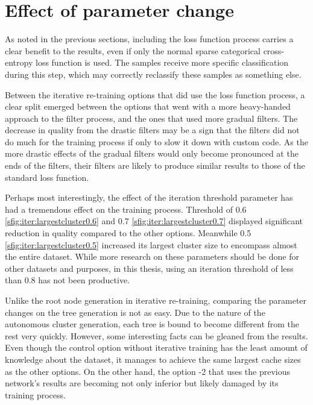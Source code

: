 
\section{Effect of parameter change}

As noted in the previous sections, including the loss function process carries a clear benefit to the results, even if only the normal sparse categorical cross-entropy loss function is used.
The samples receive more specific classification during this step, which may correctly reclassify these samples as something else.

Between the iterative re-training options that did use the loss function process, a clear split emerged between the options that went with a more heavy-handed approach to the filter process, and the ones that used more gradual filters.
The decrease in quality from the drastic filters may be a sign that the filters did not do much for the training process if only to slow it down with custom code.
As the more drastic effects of the gradual filters would only become pronounced at the ends of the filters, their filters are likely to produce similar results to those of the standard loss function.

Perhaps most interestingly, the effect of the iteration threshold parameter has had a tremendous effect on the training process.
Threshold of 0.6 \cref{sfig:iter:largestcluster0.6} and 0.7 \cref{sfig:iter:largestcluster0.7} displayed significant reduction in quality compared to the other options.
Meanwhile 0.5 \cref{sfig:iter:largestcluster0.5} increased its largest cluster size to encompass almost the entire dataset.
While more research on these parameters should be done for other datasets and purposes, in this thesis, using an iteration threshold of less than 0.8 has not been productive.


Unlike the root node generation in iterative re-training, comparing the parameter changes on the tree generation is not as easy.
Due to the nature of the autonomous cluster generation, each tree is bound to become different from the rest very quickly.
However, some interesting facts can be gleaned from the results.
Even though the control option without iterative training has the least amount of knowledge about the dataset, it manages to achieve the same largest cache sizes as the other options.
On the other hand, the option -2 that uses the previous network's results are becoming not only inferior but likely damaged by its training process.

